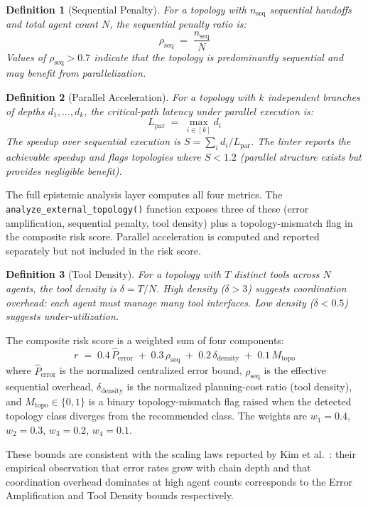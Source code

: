 \documentclass[11pt]{article}
\newtheorem{definition}{Definition}
\begin{document}
\begin{definition}[Sequential Penalty]
For a topology with $n_{\mathrm{seq}}$ sequential handoffs and total
agent count $N$, the sequential penalty ratio is:
\[
  \rho_{\mathrm{seq}} \;=\; \frac{n_{\mathrm{seq}}}{N}
\]
Values of $\rho_{\mathrm{seq}} > 0.7$ indicate that the topology is
predominantly sequential and may benefit from parallelization.
\end{definition}

\begin{definition}[Parallel Acceleration]
For a topology with $k$ independent branches of depths $d_1, \ldots, d_k$,
the critical-path latency under parallel execution is:
\[
  L_{\mathrm{par}} \;=\; \max_{i \in [k]} d_i
\]
The speedup over sequential execution is $S = \sum_i d_i / L_{\mathrm{par}}$.
The linter reports the achievable speedup and flags topologies where
$S < 1.2$ (parallel structure exists but provides negligible benefit).
\end{definition}

\noindent
The full epistemic analysis layer computes all four metrics.  The
\texttt{analyze\_external\_topology()} function exposes three of these (error
amplification, sequential penalty, tool density) plus a topology-mismatch
flag in the composite risk score.  Parallel acceleration is computed and
reported separately but not included in the risk score.

\begin{definition}[Tool Density]
For a topology with $T$ distinct tools across $N$ agents, the tool density
is $\delta = T / N$.  High density ($\delta > 3$) suggests coordination
overhead: each agent must manage many tool interfaces.  Low density
($\delta < 0.5$) suggests under-utilization.
\end{definition}

The composite risk score is a weighted sum of four components:
\[
  r \;=\; 0.4\, \hat{P}_{\mathrm{error}}
    \;+\; 0.3\, \rho_{\mathrm{seq}}
    \;+\; 0.2\, \delta_{\mathrm{density}}
    \;+\; 0.1\, M_{\mathrm{topo}}
\]
where $\hat{P}_{\mathrm{error}}$ is the normalized centralized error
bound, $\rho_{\mathrm{seq}}$ is the effective sequential overhead,
$\delta_{\mathrm{density}}$ is the normalized planning-cost ratio
(tool density), and $M_{\mathrm{topo}} \in \{0,1\}$ is a binary
topology-mismatch flag raised when the detected topology class diverges
from the recommended class.  The weights are $w_1 = 0.4$, $w_2 = 0.3$,
$w_3 = 0.2$, $w_4 = 0.1$.

These bounds are consistent with the scaling laws reported by Kim et
al.~\cite{kim2025scaling}: their empirical observation that error rates
grow with chain depth and that coordination overhead dominates at high
agent counts corresponds to the Error Amplification and Tool Density
bounds respectively.
\end{document}

